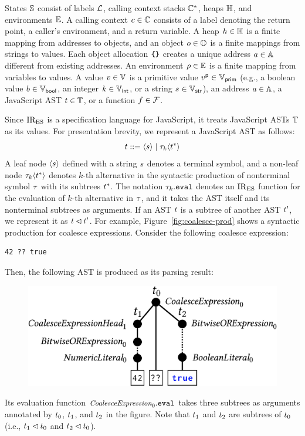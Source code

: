 States $\mathbb{S}$ consist of labels $\mathcal{L}$, calling context stacks
$\mathbb{C}^*$, heaps $\mathbb{H}$, and environments $\mathbb{E}$.  A calling context
$c \in \mathbb{C}$ consists of a label denoting the return point, a caller's
environment, and a return variable.  A heap $h \in \mathbb{H}$ is a finite
mapping from addresses to objects, and an object $o \in \mathbb{O}$ is a finite
mappings from strings to values.  Each object allocation $\texttt{\{} \texttt{\}}$ creates a
unique address $a \in \mathbb{A}$ different from existing addresses.  An
environment $\rho \in \mathbb{E}$ is a finite mapping from variables to values. A
value $v \in \mathbb{V}$ is a primitive value $v^{\textsf{p}} \in \mathbb{V}_{\textsf{prim}}$ (e.g., a
boolean value $b \in \mathbb{V}_{\textsf{bool}}$, an integer $k \in \mathbb{V}_{\textsf{int}}$, or a string
$s \in \mathbb{V}_{\textsf{str}}$), an address $a \in \mathbb{A}$, a JavaScript AST $t
\in \mathbb{T}$, or a function $f \in \mathcal{F}$.

Since $\text{IR}_\text{ES}$ is a specification language for JavaScript, it treats JavaScript
ASTs $\mathbb{T}$ as its values. For presentation brevity, we represent a JavaScript
AST as follows:
\[
  t ::= \langle s \rangle \mid \tau_k \langle t^* \rangle
\]
A leaf node $\langle s \rangle$ defined with a string $s$ denotes a terminal
symbol, and a non-leaf node $\tau_k \langle t^* \rangle$ denotes $k$-th
alternative in the syntactic production of nonterminal symbol $\tau$ with its
subtrees $t^*$.  The notation $\tau_k.\texttt{eval}$ denotes an $\text{IR}_\text{ES}$ function for
the evaluation of $k$-th alternative in $\tau$, and it takes the AST itself and
its nonterminal subtrees as arguments. If an AST $t$ is a subtree of another
AST $t'$, we represent it as $t \lhd t'$.  For example,
Figure~\ref{fig:coalesce-prod} shows a syntactic production for coalesce
expressions.  Consider the following coalesce expression:
\begin{lstlisting}[style=JS]
                    42 ?? true
\end{lstlisting}
Then, the following AST is produced as its parsing result:
\begin{figure}[H]
  \includegraphics[width=.8\columnwidth]{img/ast-example.png}
\end{figure}
\noindent Its evaluation function $\textit{\small CoalesceExpression}_0.\texttt{eval}$ takes
three subtrees as arguments annotated by $t_0$, $t_1$, and $t_2$ in
the figure. Note that $t_1$ and $t_2$ are subtrees of $t_0$ (i.e.,
$t_1 \lhd t_0$ and $t_2 \lhd t_0$).


